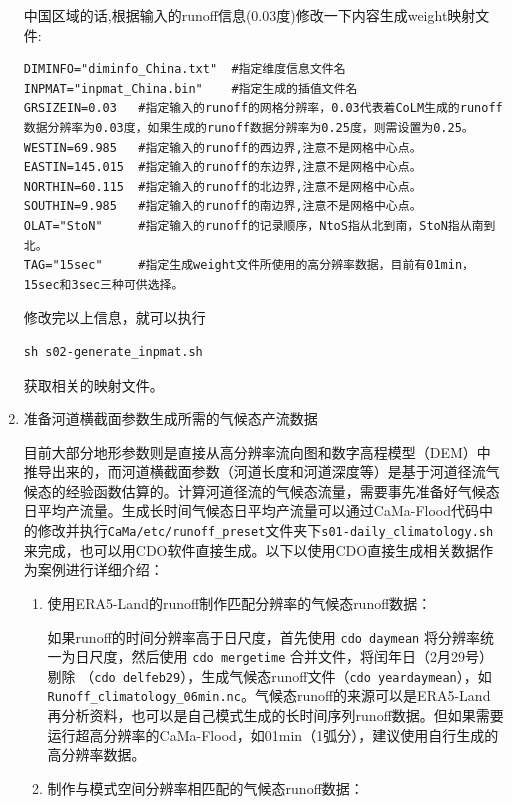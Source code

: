 \documentclass[a4paper,12pt,twoside]{article}
\begin{document}
\begin{enumerate}
中国区域的话,根据输入的runoff信息(0.03度)修改一下内容生成weight映射文件:
\begin{lstlisting}
DIMINFO="diminfo_China.txt"  #指定维度信息文件名
INPMAT="inpmat_China.bin"    #指定生成的插值文件名
GRSIZEIN=0.03   #指定输入的runoff的网格分辨率，0.03代表着CoLM生成的runoff数据分辨率为0.03度，如果生成的runoff数据分辨率为0.25度，则需设置为0.25。
WESTIN=69.985   #指定输入的runoff的西边界,注意不是网格中心点。
EASTIN=145.015  #指定输入的runoff的东边界,注意不是网格中心点。
NORTHIN=60.115  #指定输入的runoff的北边界,注意不是网格中心点。
SOUTHIN=9.985   #指定输入的runoff的南边界,注意不是网格中心点。
OLAT="StoN"     #指定输入的runoff的记录顺序，NtoS指从北到南，StoN指从南到北。
TAG="15sec"     #指定生成weight文件所使用的高分辨率数据，目前有01min，15sec和3sec三种可供选择。
\end{lstlisting}

修改完以上信息，就可以执行
\begin{lstlisting}
sh s02-generate_inpmat.sh
\end{lstlisting}
获取相关的映射文件。

\item 准备河道横截面参数生成所需的气候态产流数据

目前大部分地形参数则是直接从高分辨率流向图和数字高程模型（DEM）中推导出来的，而河道横截面参数（河道长度和河道深度等）是基于河道径流气候态的经验函数估算的。计算河道径流的气候态流量，需要事先准备好气候态日平均产流量。生成长时间气候态日平均产流量可以通过CaMa-Flood代码中的修改并执行\texttt{CaMa/etc/runoff\_preset}文件夹下\texttt{s01-daily\_climatology.sh}来完成，也可以用CDO软件直接生成。以下以使用CDO直接生成相关数据作为案例进行详细介绍：
\begin{enumerate}
%
\item 使用ERA5-Land的runoff制作匹配分辨率的气候态runoff数据：

如果runoff的时间分辨率高于日尺度，首先使用 \verb|cdo daymean| 将分辨率统一为日尺度，然后使用 \verb|cdo mergetime| 合并文件，将闰年日（2月29号）剔除 （\verb|cdo delfeb29|），生成气候态runoff文件（\verb|cdo yeardaymean|），如\texttt{Runoff\_climatology\_06min.nc}。气候态runoff的来源可以是ERA5-Land再分析资料，也可以是自己模式生成的长时间序列runoff数据。但如果需要运行超高分辨率的CaMa-Flood，如01min（1弧分），建议使用自行生成的高分辨率数据。


\item 制作与模式空间分辨率相匹配的气候态runoff数据：


\end{enumerate}
\end{enumerate}
\end{document}
